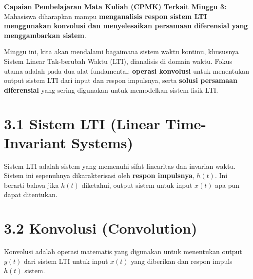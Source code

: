 \documentclass[
  letterpaper,
  DIV=11,
  numbers=noendperiod]{scrreprt}
\begin{document}
\textbf{Capaian Pembelajaran Mata Kuliah (CPMK) Terkait Minggu 3:}
Mahasiswa diharapkan mampu \textbf{menganalisis respon sistem LTI
menggunakan konvolusi dan menyelesaikan persamaan diferensial yang
menggambarkan sistem}.

Minggu ini, kita akan mendalami bagaimana sistem waktu kontinu,
khususnya Sistem Linear Tak-berubah Waktu (LTI), dianalisis di domain
waktu. Fokus utama adalah pada dua alat fundamental: \textbf{operasi
konvolusi} untuk menentukan output sistem LTI dari input dan respon
impulsnya, serta \textbf{solusi persamaan diferensial} yang sering
digunakan untuk memodelkan sistem fisik LTI.

\section{3.1 Sistem LTI (Linear Time-Invariant
Systems)}\label{sistem-lti-linear-time-invariant-systems}

Sistem LTI adalah sistem yang memenuhi sifat linearitas dan invarian
waktu. Sistem ini sepenuhnya dikarakterisasi oleh \textbf{respon
impulsnya}, \(h(t)\). Ini berarti bahwa jika \(h(t)\) diketahui, output
sistem untuk input \(x(t)\) apa pun dapat ditentukan.

\section{3.2 Konvolusi (Convolution)}\label{konvolusi-convolution}

Konvolusi adalah operasi matematis yang digunakan untuk menentukan
output \(y(t)\) dari sistem LTI untuk input \(x(t)\) yang diberikan dan
respon impuls \(h(t)\) sistem.
\end{document}
